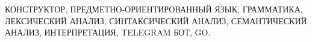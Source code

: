 КОНСТРУКТОР,
ПРЕДМЕТНО-ОРИЕНТИРОВАННЫЙ ЯЗЫК,
ГРАММАТИКА,
ЛЕКСИЧЕСКИЙ АНАЛИЗ,
СИНТАКСИЧЕСКИЙ АНАЛИЗ,
СЕМАНТИЧЕСКИЙ АНАЛИЗ,
ИНТЕРПРЕТАЦИЯ,
TELEGRAM БОТ,
GO.
